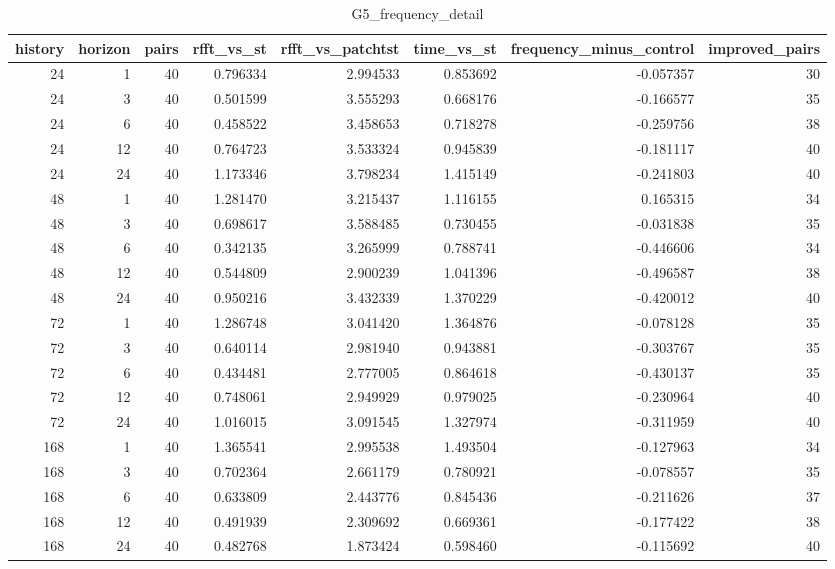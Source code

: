 \begin{table}
\caption{G5_frequency_detail}
\label{tab:G5_frequency_detail}
\begin{tabular}{rrrrrrrr}
\toprule
history & horizon & pairs & rfft\_vs\_st & rfft\_vs\_patchtst & time\_vs\_st & frequency\_minus\_control & improved\_pairs \\
\midrule
24 & 1 & 40 & 0.796334 & 2.994533 & 0.853692 & -0.057357 & 30 \\
24 & 3 & 40 & 0.501599 & 3.555293 & 0.668176 & -0.166577 & 35 \\
24 & 6 & 40 & 0.458522 & 3.458653 & 0.718278 & -0.259756 & 38 \\
24 & 12 & 40 & 0.764723 & 3.533324 & 0.945839 & -0.181117 & 40 \\
24 & 24 & 40 & 1.173346 & 3.798234 & 1.415149 & -0.241803 & 40 \\
48 & 1 & 40 & 1.281470 & 3.215437 & 1.116155 & 0.165315 & 34 \\
48 & 3 & 40 & 0.698617 & 3.588485 & 0.730455 & -0.031838 & 35 \\
48 & 6 & 40 & 0.342135 & 3.265999 & 0.788741 & -0.446606 & 34 \\
48 & 12 & 40 & 0.544809 & 2.900239 & 1.041396 & -0.496587 & 38 \\
48 & 24 & 40 & 0.950216 & 3.432339 & 1.370229 & -0.420012 & 40 \\
72 & 1 & 40 & 1.286748 & 3.041420 & 1.364876 & -0.078128 & 35 \\
72 & 3 & 40 & 0.640114 & 2.981940 & 0.943881 & -0.303767 & 35 \\
72 & 6 & 40 & 0.434481 & 2.777005 & 0.864618 & -0.430137 & 35 \\
72 & 12 & 40 & 0.748061 & 2.949929 & 0.979025 & -0.230964 & 40 \\
72 & 24 & 40 & 1.016015 & 3.091545 & 1.327974 & -0.311959 & 40 \\
168 & 1 & 40 & 1.365541 & 2.995538 & 1.493504 & -0.127963 & 34 \\
168 & 3 & 40 & 0.702364 & 2.661179 & 0.780921 & -0.078557 & 35 \\
168 & 6 & 40 & 0.633809 & 2.443776 & 0.845436 & -0.211626 & 37 \\
168 & 12 & 40 & 0.491939 & 2.309692 & 0.669361 & -0.177422 & 38 \\
168 & 24 & 40 & 0.482768 & 1.873424 & 0.598460 & -0.115692 & 40 \\
\bottomrule
\end{tabular}
\end{table}
